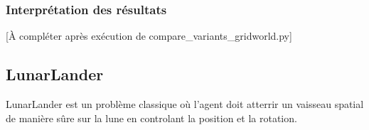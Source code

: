 \subsubsection*{Interprétation des résultats}

[À compléter après exécution de compare\_variants\_gridworld.py]


\subsection{LunarLander}

LunarLander est un problème classique où l'agent doit atterrir un vaisseau spatial de manière sûre sur la lune en controlant la position et la rotation.

